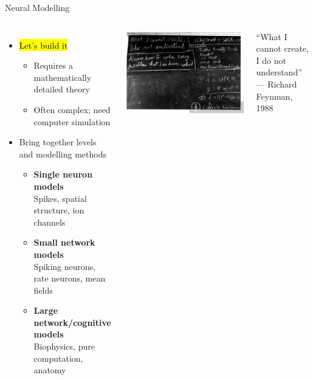 \documentclass[handout,aspectratio=169]{beamer}
\begin{document}
\begin{frame}{Neural Modelling}
	\begin{overlayarea}{\textwidth}{7cm}
		\begin{columns}[c]
			\begin{itemize}
				\setlength\itemsep{0.25cm}
				\item<2-> \hl{Let's build it}\\[0.125cm]
				\begin{itemize}
					\setlength\itemsep{0.25cm}
					\item Requires a mathematically detailed theory
					\item Often complex; need computer simulation
				\end{itemize}
				\item<3-> Bring together levels and modelling methods\\[0.125cm]
				\begin{itemize}
					\setlength\itemsep{0.25cm}
					\item \textbf{Single neuron models}\\
					Spikes, spatial structure, ion channels\textellipsis
					\item \textbf{Small network models}\\
					Spiking neurons, rate neurons, mean fields\textellipsis
					\item \textbf{Large network/cognitive models}\\
					Biophysics, pure computation, anatomy\textellipsis
				\end{itemize}
			\end{itemize}
			\centering
			\includegraphics[width=\columnwidth]{media/feynman_blackboard.jpg}
			\begin{center}
				\color{aluminium4}
				\quotefont \enquote{What I cannot create, I do not understand} \\ --- Richard Feynman, 1988
			\end{center}
		\end{columns}
	\end{overlayarea}
\end{frame}
\end{document}
